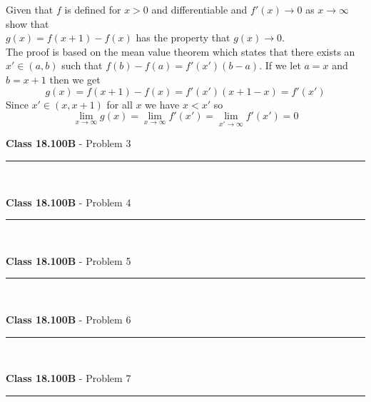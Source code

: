 \documentclass[11pt,reqno]{article}
\begin{document}
Given that $f$ is defined for $x > 0$ and differentiable and $f'(x) \to 0$ as $x \to \infty$ show that \\
$g(x) = f(x+1) - f(x)$ has the property that $g(x) \to 0$.  \\
\indent The proof is based on the mean value theorem which states that there exists an $x' \in (a,b)$ such that $f(b)-f(a) = f'(x')(b-a)$. If we let $a = x$ and $b = x+1$ then we get 
\[ g(x) = f(x+1) - f(x) = f'(x')(x+1 - x) = f'(x') \]
Since $x' \in (x,x+1)$ for all $x$ we have $x < x'$ so 
\[ \lim_{x \to \infty} g(x) = \lim_{x \to \infty} f'(x')  =   \lim_{x' \to \infty} f'(x') = 0\]

\vspace{15pt}
\begin{flushleft} 
\textbf{Class 18.100B} - Problem 3\\
\rule{500pt}{1pt}\\
\end{flushleft} 



\vspace{15pt}
\begin{flushleft} 
\textbf{Class 18.100B} - Problem 4\\
\rule{500pt}{1pt}\\
\end{flushleft} 


\vspace{15pt}
\begin{flushleft} 
\textbf{Class 18.100B} - Problem 5\\
\rule{500pt}{1pt}\\
\end{flushleft} 


\vspace{15pt}
\begin{flushleft} 
\textbf{Class 18.100B} - Problem 6\\
\rule{500pt}{1pt}\\
\end{flushleft} 


\vspace{15pt}
\begin{flushleft} 
\textbf{Class 18.100B} - Problem 7\\
\rule{500pt}{1pt}\\
\end{flushleft} 


\end{document}
